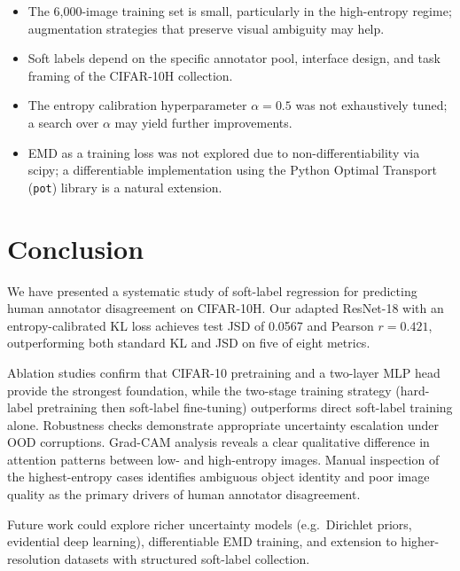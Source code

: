 \documentclass[11pt,a4paper]{article}
\begin{document}
\begin{itemize}[noitemsep]
  \item The 6,000-image training set is small, particularly in the high-entropy
        regime; augmentation strategies that preserve visual ambiguity may help.
  \item Soft labels depend on the specific annotator pool, interface design,
        and task framing of the CIFAR-10H collection.
  \item The entropy calibration hyperparameter $\alpha = 0.5$ was not
        exhaustively tuned; a search over $\alpha$ may yield further
        improvements.
  \item EMD as a training loss was not explored due to non-differentiability
        via scipy; a differentiable implementation using the Python Optimal
        Transport (\texttt{pot}) library is a natural extension.
\end{itemize}

\section{Conclusion}

We have presented a systematic study of soft-label regression for predicting
human annotator disagreement on CIFAR-10H.
Our adapted ResNet-18 with an entropy-calibrated KL loss achieves test JSD of
0.0567 and Pearson $r = 0.421$, outperforming both standard KL and JSD on
five of eight metrics.

Ablation studies confirm that CIFAR-10 pretraining and a two-layer MLP head
provide the strongest foundation, while the two-stage training strategy
(hard-label pretraining then soft-label fine-tuning) outperforms direct
soft-label training alone.
Robustness checks demonstrate appropriate uncertainty escalation under OOD
corruptions.
Grad-CAM analysis reveals a clear qualitative difference in attention patterns
between low- and high-entropy images.
Manual inspection of the highest-entropy cases identifies ambiguous object
identity and poor image quality as the primary drivers of human annotator
disagreement.

Future work could explore richer uncertainty models (e.g.\ Dirichlet priors,
evidential deep learning), differentiable EMD training, and extension to
higher-resolution datasets with structured soft-label collection.

\printbibliography
\end{document}

